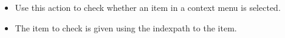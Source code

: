 
\begin{itemize}
\item Use this action to check whether an item in a context menu is selected.
\item The item to check is given using the indexpath to the item. 
\end{itemize}



